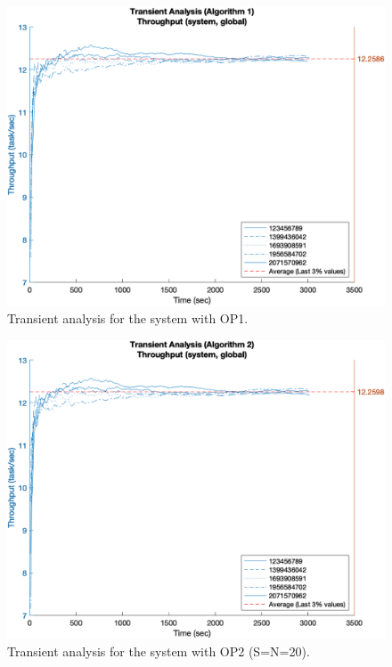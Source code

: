 \begin{figure}
	\includegraphics[width=\columnwidth]{fig/evaluation-transient-analysis-throughput-algorithm-1}
	\caption{Transient analysis for the system with OP1.}
	\label{fig:evaluation-transient-analysis-throughput-1}
\end{figure}

\begin{figure}
	\includegraphics[width=\columnwidth]{fig/evaluation-transient-analysis-throughput-algorithm-2}
	\caption{Transient analysis for the system with OP2 (S=N=20).}
	\label{fig:evaluation-transient-analysis-throughput-2}
\end{figure}


